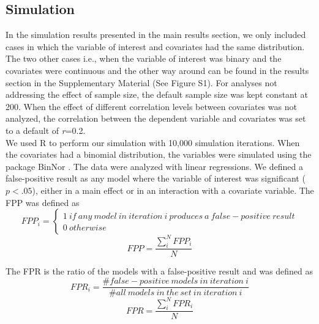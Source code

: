 \subsection{Simulation}
In the simulation results presented in the main results section, we only included cases in which the variable of interest and covariates had the same distribution. The two other cases i.e., when the variable of interest was binary and the covariates were continuous and the other way around can be found in the results section in the Supplementary Material (See Figure S1). For analyses not addressing the effect of sample size, the default sample size was kept constant at 200. When the effect of different correlation levels between covariates was not analyzed, the correlation between the dependent variable and covariates was set to a default of \textit{r}=0.2.\\
We used R \citep{Team2018} to perform our simulation with 10,000 simulation iterations. When the covariates had a binomial distribution, the variables were simulated using the package BinNor \citep{Demirtas2014}. The data were analyzed with linear regressions. We defined a false-positive result as any model where the variable of interest was significant ($p < .05$), either in a main effect or in an interaction with a covariate variable. The FPP was defined as \\

\[FPP_i=\left. \left\{\begin{array}{c}
1\ if\ any\ model\ in\ iteration\ i\ produces\ a\ false-positive\ result \\ 
0\ otherwise\  \end{array}
\right.\] 
\[FPP=\frac{\sum_{i}^{N}{FPP_i}}{N}\] 

The FPR is the ratio of the models with a false-positive result and was defined as \\

\[FPR_i=\frac{\#false-positive\ models\ in\ iteration\ i}{\#all\ models\ in\ the\ set\ in\ iteration\ i}\] 
\[FPR=\frac{\sum_{i}^{N}{FPR_i}}{N}\] 




